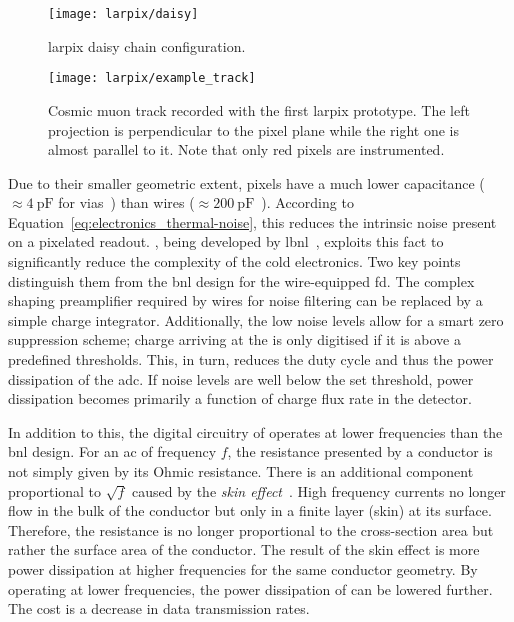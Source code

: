 \begin{figure}[htb]
	\centering
	\texttt{[image: larpix/daisy]}
	\caption[ daisy chain]{%
		\acrshort{larpix} daisy chain configuration.~\cite{larpix_spec}
	}
	\label{fig:larpix_daisy}
\end{figure}

\begin{figure}[htb]
	\centering
	\texttt{[image: larpix/example\_track]}
	\caption[ prototype event]{%
		Cosmic muon track recorded with the first \acrshort{larpix} prototype.
		The left projection is perpendicular to the pixel plane while the right one is almost parallel to it.
		Note that only red pixels are instrumented.~\cite{danLarpix}
	}
	\label{fig:larpix_track}
\end{figure}

Due to their smaller geometric extent, pixels have a much lower capacitance ($\approx \SI{4}{\pico\farad}$ for vias~\cite{larpix_spec}) than wires ($\approx \SI{200}{\pico\farad}$~\cite{protodune-sp}).
According to Equation~\eqref{eq:electronics_thermal-noise}, this reduces the intrinsic noise present on a pixelated readout.
\larpix{}, being developed by \gls{lbnl}~\cite{larpix, larpix_spec}, exploits this fact to significantly reduce the complexity of the cold electronics.
Two key points distinguish them from the \gls{bnl} design for the wire-equipped \gls{fd}.
The complex shaping preamplifier required by wires for noise filtering can be replaced by a simple charge integrator.
Additionally, the low noise levels allow for a smart zero suppression scheme; charge arriving at the \larpix{} is only digitised if it is above a predefined thresholds.
This, in turn, reduces the duty cycle and thus the power dissipation of the \gls{adc}.
If noise levels are well below the set threshold, power dissipation becomes primarily a function of charge flux rate in the detector.

In addition to this, the digital circuitry of \larpix{} operates at lower frequencies than the \gls{bnl} design.
For an \gls{ac} of frequency $f$, the resistance presented by a conductor is not simply given by its Ohmic resistance.
There is an additional component proportional to $\sqrt{f}$ caused by the \emph{skin effect}~\cite{horowitzHill}.
High frequency currents no longer flow in the bulk of the conductor but only in a finite layer (skin) at its surface.
Therefore, the resistance is no longer proportional to the cross-section area but rather the surface area of the conductor.
The result of the skin effect is more power dissipation at higher frequencies for the same conductor geometry.
By operating at lower frequencies, the power dissipation of \larpix{} can be lowered further.
The cost is a decrease in data transmission rates.

